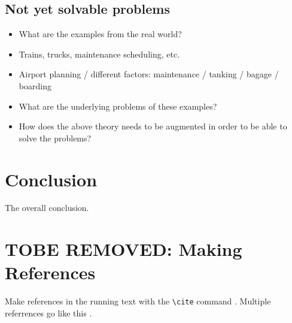 \documentclass{article}
\begin{document}
\subsection{Not yet solvable problems}
\begin{itemize}
\item What are the examples from the real world?
\item Trains, trucks, maintenance scheduling, etc.
\item Airport planning / different factors: maintenance / tanking / bagage / boarding
\item What are the underlying problems of these examples?
\item How does the above theory needs to be augmented in order to be able to solve the problems?
\end{itemize}

\section{Conclusion}

The overall conclusion.

\section{TOBE REMOVED: Making References}

  Make references in the running text with the \verb+\cite+
  command \cite{dijkstra68}. Multiple referrences go like this
  \cite{charniak85,steels98}.




\end{document}
